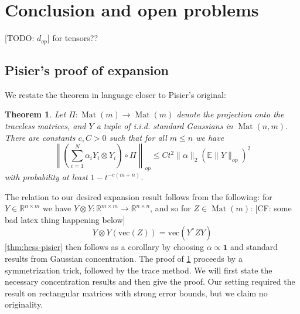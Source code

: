 \documentclass[aos]{imsart}
\newtheorem{theorem}{Theorem}
\theoremstyle{definition}
\DeclareMathOperator{\mat}{Mat}
\newcommand{\R}{{\mathbb{R}}}
\renewcommand{\vec}{\bm}
\newcommand{\E}{\mathbb{E}}
\newcommand{\samp}{x}
\newcommand{\CF}[1]{{\color{purple}[CF: #1]}}
\newcommand{\TODO}[1]{{\color{blue}[TODO: #1]}}
\begin{document}
\section{Conclusion and open problems}
\TODO{$d_{op}$} for tensors??


\begin{appendix}




\section{Pisier's proof of expansion}\label{sec:pisier}
We restate the theorem in language closer to Pisier's original:

\begin{theorem} \label{thm:Pisier-expansion}
Let $\Pi: \mat(m) \to \mat(m)$ denote the projection onto the traceless matrices, and $Y$ a tuple of i.i.d. standard Gaussians in $\mat(n,m)$. There are constants $c,C > 0$ such that for all $m \leq n$ we have
\[ \left\| \left(\sum_{i=1}^{N} \alpha_{i} Y_{i} \otimes Y_{i}\right) \circ \Pi \right\|_{op} \leq C t^{2} \|\alpha\|_{2} \left( \E \|Y\|_{op} \right)^{2} \]
with probability at least $ 1- t^{-c(m+n)}$.
\end{theorem}

The relation to our desired expansion result follows from the following: for $Y \in \R^{n \times m}$ we have $Y \otimes Y : \R^{m \times m} \to \R^{n \times n}$, and so for $Z \in \mat(m)$:  \CF{some bad latex thing happening below}
\[ Y \otimes Y (\text{vec}(Z)) = \text{vec}( Y^{*} Z Y)      \]
\cref{thm:hess-pisier} then follows as a corollary by choosing $\alpha \propto \vec{1}$ and standard results from Gaussian concentration. The proof of \cref{thm:Pisier-expansion} proceeds by a symmetrization trick, followed by the trace method. We will first state the necessary concentration results and then give the proof. Our setting required the result on rectangular matrices with strong error bounds, but we claim no originality.


\end{appendix}
\end{document}
